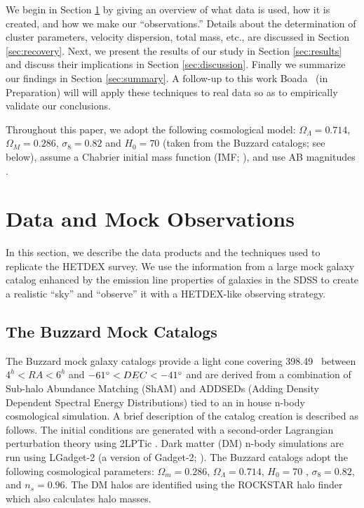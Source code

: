 \documentclass[fleqn,usenatbib]{mnras}
\begin{document}
We begin in Section \ref{sec:Data} by giving an overview of what data is used, how it is created, and how we make our ``observations.'' Details about the determination of cluster parameters, velocity dispersion, total mass, etc., are discussed in Section \ref{sec:recovery}. Next, we present the results of our study in Section \ref{sec:results} and discuss their implications in Section \ref{sec:discussion}. Finally we summarize our findings in Section \ref{sec:summary}. A follow-up to this work Boada \etal\ (in Preparation) will will apply these techniques to real data so as to empirically validate our conclusions. 

Throughout this paper, we adopt the following cosmological model: $\Omega_\Lambda = 0.714$, $\Omega_M = 0.286$, $\sigma_8 = 0.82$ and $H_0= 70$ \kms \mpc (taken from the Buzzard catalogs; see below), assume a Chabrier initial mass function (IMF; \citealt{Chabrier2003}), and use AB magnitudes \citep{Oke1974}.

\section{Data and Mock Observations}\label{sec:Data}
In this section, we describe the data products and the techniques used to replicate the HETDEX survey. We use the information from a large mock galaxy catalog enhanced by the emission line properties of galaxies in the SDSS to create a realistic ``sky'' and ``observe'' it with a HETDEX-like observing strategy.

\subsection{The Buzzard Mock Catalogs}\label{sec: Buzzard}
The Buzzard mock galaxy catalogs provide a light cone covering 398.49 \degsq\ between $4^h< RA < 6^h$ and $-61\hbox{$^\circ$} < DEC < -41\hbox{$^\circ$}$ and are derived from a combination of Sub-halo Abundance Matching (ShAM) and ADDSEDs (Adding Density Dependent Spectral Energy Distributions) tied to an in house n-body cosmological simulation. A brief description of the catalog creation is described as follows. The initial conditions are generated with a second-order Lagrangian perturbation theory using {\sc 2LPTic} \citep{Crocce2006}. Dark matter (DM) n-body simulations are run using {\sc LGadget-2} (a version of {\sc Gadget-2}; \citealt{Springel2005}). The Buzzard catalogs adopt the following cosmological parameters: $\Omega_m = 0.286$, $\Omega_\Lambda = 0.714$, $H_0 = 70$ \kms \mpc, $\sigma_8 = 0.82$, and $n_s = 0.96$. The DM halos are identified using the {\sc ROCKSTAR} halo finder \citep{Behroozi2013} which also calculates halo masses. 
\end{document}
